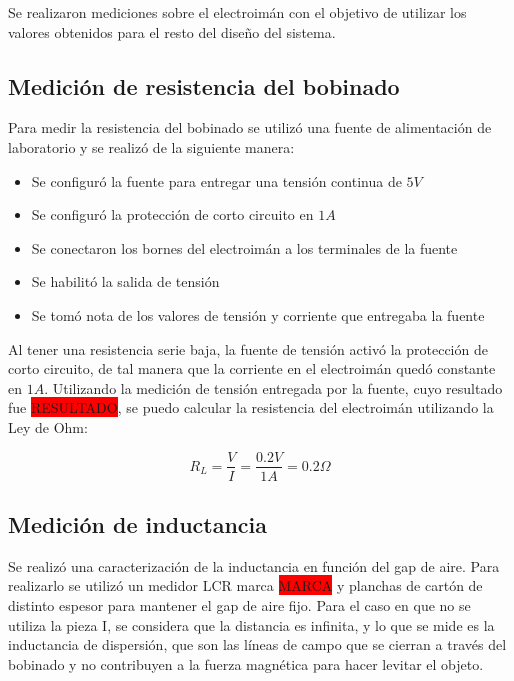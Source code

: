 \noindent Se realizaron mediciones sobre el electroimán con el objetivo de utilizar los valores obtenidos para el resto del diseño del sistema.

\subsection{Medición de resistencia del bobinado}

\noindent Para medir la resistencia del bobinado se utilizó una fuente de alimentación de laboratorio y se realizó de la siguiente manera:

\begin{itemize}
	\item Se configuró la fuente para entregar una tensión continua de $5V$
	\item Se configuró la protección de corto circuito en $1A$
	\item Se conectaron los bornes del electroimán a los terminales de la fuente
	\item Se habilitó la salida de tensión
	\item Se tomó nota de los valores de tensión y corriente que entregaba la fuente
\end{itemize}

\noindent Al tener una resistencia serie baja, la fuente de tensión activó la protección de corto circuito, de tal manera que la corriente en el electroimán quedó constante en $1A$. Utilizando la medición de tensión entregada por la fuente, cuyo resultado fue \colorbox{red}{RESULTADO}, se puedo calcular la resistencia del electroimán utilizando la Ley de Ohm:

\begin{equation}
	R_{L}=\frac{V}{I}=\frac{0.2V}{1A}=0.2\Omega
\end{equation}

\subsection{Medición de inductancia}

\noindent Se realizó una caracterización de la inductancia en función del gap de aire. Para realizarlo se utilizó un medidor LCR marca \colorbox{red}{MARCA} y planchas de cartón de distinto espesor para mantener el gap de aire fijo. Para el caso en que no se utiliza la pieza I, se considera que la distancia es infinita, y lo que se mide es la inductancia de dispersión, que son las líneas de campo que se cierran a través del bobinado y no contribuyen a la fuerza magnética para hacer levitar el objeto.


